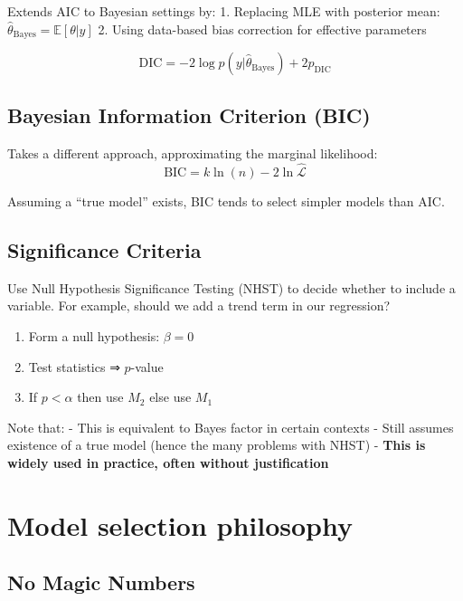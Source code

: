 \documentclass[
  letterpaper,
  DIV=11,
  numbers=noendperiod]{scrreprt}
\providecommand{\tightlist}{%
  \setlength{\itemsep}{0pt}\setlength{\parskip}{0pt}}
\begin{document}
Extends AIC to Bayesian settings by: 1. Replacing MLE with posterior
mean: \(\hat{\theta}_{\text{Bayes}} = \mathbb{E}[\theta | y]\) 2. Using
data-based bias correction for effective parameters

\[
\text{DIC} = -2\log p(y | \hat{\theta}_{\text{Bayes}}) + 2p_{\text{DIC}}
\]

\subsection{Bayesian Information Criterion
(BIC)}\label{bayesian-information-criterion-bic}

Takes a different approach, approximating the marginal likelihood: \[
\text{BIC} = k\ln(n) - 2\ln\hat{\mathcal{L}}
\]

Assuming a ``true model'' exists, BIC tends to select simpler models
than AIC.

\subsection{Significance Criteria}\label{significance-criteria}

Use Null Hypothesis Significance Testing (NHST) to decide whether to
include a variable. For example, should we add a trend term in our
regression?

\begin{enumerate}
\def\labelenumi{\arabic{enumi}.}
\tightlist
\item
  Form a null hypothesis: \(\beta = 0\)
\item
  Test statistics ⇒ \(p\)-value
\item
  If \(p < \alpha\) then use \(M_2\) else use \(M_1\)
\end{enumerate}

Note that: - This is equivalent to Bayes factor in certain contexts -
Still assumes existence of a true model (hence the many problems with
NHST) - \textbf{This is widely used in practice, often without
justification}

\section{Model selection philosophy}\label{model-selection-philosophy}

\subsection{No Magic Numbers}\label{no-magic-numbers}
\end{document}
